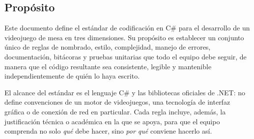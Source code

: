 \subsection{Propósito}

Este documento define el estándar de codificación en C\# para el desarrollo de un videojuego de mesa en tres dimensiones. Su propósito es establecer un conjunto único de reglas de nombrado, estilo, complejidad, manejo de errores, documentación, bitácoras y pruebas unitarias que todo el equipo debe seguir, de manera que el código resultante sea consistente, legible y mantenible independientemente de quién lo haya escrito.

El alcance del estándar es el lenguaje C\# y las bibliotecas oficiales de .NET: no define convenciones de un motor de videojuegos, una tecnología de interfaz gráfica o de conexión de red en particular. Cada regla incluye, además, la justificación técnica o académica en la que se apoya, para que el equipo comprenda no solo \emph{qué} debe hacer, sino \emph{por qué} conviene hacerlo así.
